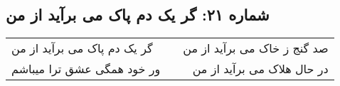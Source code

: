 \begin{center}
\section*{شماره ۲۱: گر یک دم پاک می برآید از من}
\label{sec:021}
\begin{longtable}{l p{0.5cm} r}
گر یک دم پاک می برآید از من
&&
صد گنج ز خاک می برآید از من
\\
ور خود همگی عشق ترا میباشم
&&
در حال هلاک می برآید از من
\\
\end{longtable}
\end{center}
